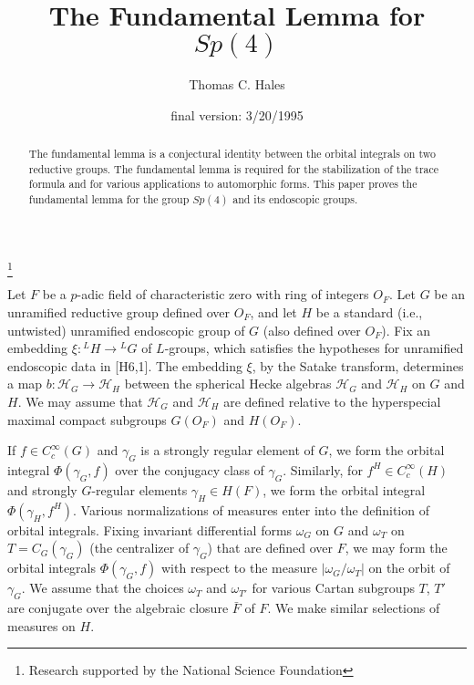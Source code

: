 \documentclass{amsart}
\newcommand\cH{{\mathcal H}}
\begin{document}
\title{The Fundamental Lemma for $Sp(4)$}
\author{Thomas C. Hales}
\address{Ann Arbor, Michigan}
\thanks{Research supported by the National Science Foundation}
\date{final version: 3/20/1995}


\begin{abstract}
The fundamental lemma is a conjectural identity between the orbital
integrals on two reductive groups.  The fundamental lemma is required
for the stabilization of the trace formula and for various
applications to automorphic forms.  This paper proves the fundamental
lemma for the group $Sp(4)$ and its endoscopic groups.
\end{abstract}




\maketitle





Let $F$ be a $p$-adic field of characteristic zero with
ring of integers $O_F$.  Let $G$ be an 
 unramified reductive
group defined over $O_F$, and let $H$ be a standard
(i.e., untwisted) unramified
endoscopic group of $G$ (also defined over $O_F$). 
Fix an embedding $\xi: {}^LH\to {}^LG$ of $L$-groups, which
satisfies the hypotheses for unramified endoscopic data
in [H6,1].
The embedding $\xi$, by the Satake transform, determines a map
$b: \cH_G \to \cH_H$ between the spherical Hecke algebras $\cH_G$
and $\cH_H$ on $G$ and $H$.  We may assume that $\cH_G$ and $\cH_H$
are defined relative to the hyperspecial maximal compact subgroups
$G(O_F)$ and $H(O_F)$.

If $f\in C_c^\infty(G)$ 
and $\gamma_G$ is a strongly regular element of $G$,
we form the orbital integral $\Phi(\gamma_G,f)$ over the conjugacy
class of $\gamma_G$.  Similarly, for $f^H\in C_c^\infty(H)$ 
and strongly
$G$-regular elements $\gamma_H\in H(F)$, we form the orbital integral
$\Phi(\gamma_H,f^H)$.  Various normalizations of measures
enter into the definition of orbital integrals.  
Fixing invariant 
differential forms $\omega_G$
on $G$ and $\omega_T$ on $T=C_G(\gamma_G)$ (the centralizer
of $\gamma_G$) that are defined over $F$,
we may form the orbital integrals $\Phi(\gamma_G,f)$ with
respect to the measure $|\omega_G/\omega_T|$ on the orbit of $\gamma_G$.
We assume that the choices $\omega_T$ and $\omega_{T'}$ for various
Cartan subgroups $T$, $T'$ are conjugate over the algebraic closure
$\bar F$ of $F$.  We make similar selections of measures on $H$.
\end{document}
